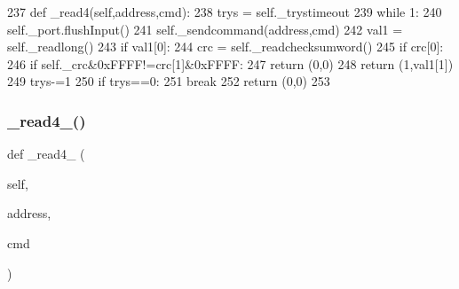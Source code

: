 \begin{DoxyCode}
237     \textcolor{keyword}{def }\_read4(self,address,cmd):
238         trys = self.\_trystimeout
239         \textcolor{keywordflow}{while} 1:
240             self.\_port.flushInput()
241             self.\_sendcommand(address,cmd)
242             val1 = self.\_readlong()
243             \textcolor{keywordflow}{if} val1[0]:
244                 crc = self.\_readchecksumword()
245                 \textcolor{keywordflow}{if} crc[0]:
246                     \textcolor{keywordflow}{if} self.\_crc&0xFFFF!=crc[1]&0xFFFF:
247                         \textcolor{keywordflow}{return} (0,0)
248                     \textcolor{keywordflow}{return} (1,val1[1])
249             trys-=1
250             \textcolor{keywordflow}{if} trys==0:
251                 \textcolor{keywordflow}{break}
252         \textcolor{keywordflow}{return} (0,0)
253 
\end{DoxyCode}
\mbox{\label{classtoxic__hardware_1_1roboclaw__3_1_1Roboclaw_a3bb41979a524d23c5330db2b445a4a6f}} 
\subsubsection{\texorpdfstring{\+\_\+read4\+\_()}{\_read4\_1()}}
{\footnotesize\ttfamily def \+\_\+read4\+\_ (\begin{DoxyParamCaption}\item[{}]{self,  }\item[{}]{address,  }\item[{}]{cmd }\end{DoxyParamCaption})\hspace{0.3cm}{\ttfamily [private]}}


